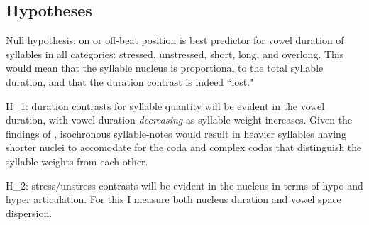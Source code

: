 \subsection{Hypotheses}
Null hypothesis: on or off-beat position is best predictor for vowel duration of syllables in all categories: stressed, unstressed, short, long, and overlong. This would mean that the syllable nucleus is proportional to the total syllable duration, and that the duration contrast is indeed ``lost." 

H_{1}: duration contrasts for syllable quantity will be evident in the vowel duration, with vowel duration {\it decreasing} as syllable weight increases. Given the findings of \citep{rosslehiste}, isochronous syllable-notes would result in heavier syllables having shorter nuclei to accomodate for the coda and complex codas that distinguish the syllable weights from each other. 

H_{2}: stress/unstress contrasts will be evident in the nucleus in terms of hypo and hyper articulation. For this I measure both nucleus duration and vowel space dispersion. 

